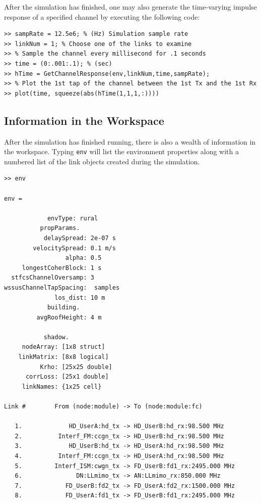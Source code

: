 After the simulation has finished, one may also generate the time-varying impulse response of a specified channel by executing the following code:

\begin{lstlisting}[numbers=none]
>> sampRate = 12.5e6; % (Hz) Simulation sample rate
>> linkNum = 1; % Choose one of the links to examine
>> % Sample the channel every millisecond for .1 seconds
>> time = (0:.001:.1); % (sec)
>> hTime = GetChannelResponse(env,linkNum,time,sampRate);
>> % Plot the 1st tap of the channel between the 1st Tx and the 1st Rx
>> plot(time, squeeze(abs(hTime(1,1,1,:))))
\end{lstlisting}


\subsection{Information in the Workspace}
After the simulation has finished running, there is also a wealth of
information in the workspace.  Typing \verb+env+ will list the
environment properties along with a numbered list of the link
objects created during the simulation.

\begin{lstlisting}[numbers=none]
>> env

env = 

            envType: rural
          propParams.
           delaySpread: 2e-07 s
        velocitySpread: 0.1 m/s
                 alpha: 0.5
     longestCoherBlock: 1 s
  stfcsChannelOversamp: 3
wssusChannelTapSpacing:  samples
              los_dist: 10 m
            building.
         avgRoofHeight: 4 m

           shadow.
     nodeArray: [1x8 struct]
    linkMatrix: [8x8 logical]
          Krho: [25x25 double]
      corrLoss: [25x1 double]
     linkNames: {1x25 cell}

Link #        From (node:module) -> To (node:module:fc)

   1.             HD_UserA:hd_tx -> HD_UserB:hd_rx:98.500 MHz
   2.          Interf_FM:ccgn_tx -> HD_UserB:hd_rx:98.500 MHz
   3.             HD_UserB:hd_tx -> HD_UserA:hd_rx:98.500 MHz
   4.          Interf_FM:ccgn_tx -> HD_UserA:hd_rx:98.500 MHz
   5.         Interf_ISM:cwgn_tx -> FD_UserB:fd1_rx:2495.000 MHz
   6.               DN:LLmimo_tx -> AN:LLmimo_rx:850.000 MHz 
   7.            FD_UserB:fd2_tx -> FD_UserA:fd2_rx:1500.000 MHz
   8.            FD_UserA:fd1_tx -> FD_UserB:fd1_rx:2495.000 MHz
\end{lstlisting}

